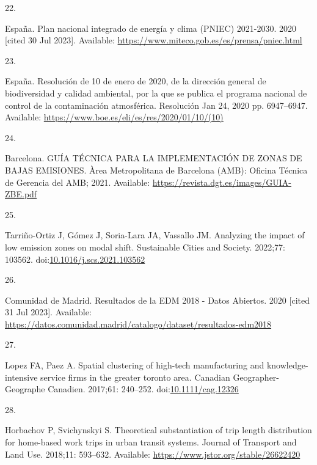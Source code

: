 \documentclass[10pt,letterpaper]{article}
\newlength{\cslhangindent}
\newlength{\csllabelwidth}
\newlength{\cslentryspacingunit} %
\newenvironment{CSLReferences}[2] %
 {%
  \setlength{\parindent}{0pt}
  \ifodd #1
  \let\oldpar\par
  \def\par{\hangindent=\cslhangindent\oldpar}
  \fi
  \setlength{\parskip}{#2\cslentryspacingunit}
 }%
 {}
\newcommand{\CSLLeftMargin}[1]{\parbox[t]{\csllabelwidth}{#1}}
\newcommand{\CSLRightInline}[1]{\parbox[t]{\linewidth - \csllabelwidth}{#1}\break}
\begin{document}
\begin{CSLReferences}{0}{0}
\leavevmode{}%
\CSLLeftMargin{22. }%
\CSLRightInline{España. Plan nacional integrado de energía y clima
({PNIEC}) 2021-2030. 2020 {[}cited 30 Jul 2023{]}. Available:
\url{https://www.miteco.gob.es/es/prensa/pniec.html}}

\leavevmode{}%
\CSLLeftMargin{23. }%
\CSLRightInline{España. Resolución de 10 de enero de 2020, de la
dirección general de biodiversidad y calidad ambiental, por la que se
publica el programa nacional de control de la contaminación atmosférica.
Resolución Jan 24, 2020 pp. 6947--6947. Available:
\url{https://www.boe.es/eli/es/res/2020/01/10/(10)}}

\leavevmode{}%
\CSLLeftMargin{24. }%
\CSLRightInline{Barcelona. {GUÍA} {TÉCNICA} {PARA} {LA} {IMPLEMENTACIÓN}
{DE} {ZONAS} {DE} {BAJAS} {EMISIONES}. Àrea Metropolitana de Barcelona
({AMB}): Oficina Técnica de Gerencia del {AMB}; 2021. Available:
\url{https://revista.dgt.es/images/GUIA-ZBE.pdf}}

\leavevmode{}%
\CSLLeftMargin{25. }%
\CSLRightInline{Tarriño-Ortiz J, Gómez J, Soria-Lara JA, Vassallo JM.
Analyzing the impact of low emission zones on modal shift. Sustainable
Cities and Society. 2022;77: 103562.
doi:\href{https://doi.org/10.1016/j.scs.2021.103562}{10.1016/j.scs.2021.103562}}

\leavevmode{}%
\CSLLeftMargin{26. }%
\CSLRightInline{Comunidad de Madrid. Resultados de la {EDM} 2018 - Datos
Abiertos. 2020 {[}cited 31 Jul 2023{]}. Available:
\url{https://datos.comunidad.madrid/catalogo/dataset/resultados-edm2018}}

\leavevmode{}%
\CSLLeftMargin{27. }%
\CSLRightInline{Lopez FA, Paez A. Spatial clustering of high-tech
manufacturing and knowledge-intensive service firms in the greater
toronto area. Canadian Geographer-Geographe Canadien. 2017;61: 240--252.
doi:\href{https://doi.org/10.1111/cag.12326}{10.1111/cag.12326}}

\leavevmode{}%
\CSLLeftMargin{28. }%
\CSLRightInline{Horbachov P, Svichynskyi S. Theoretical substantiation
of trip length distribution for home-based work trips in urban transit
systems. Journal of Transport and Land Use. 2018;11: 593--632.
Available: \url{https://www.jstor.org/stable/26622420}}


\end{CSLReferences}
\end{document}
